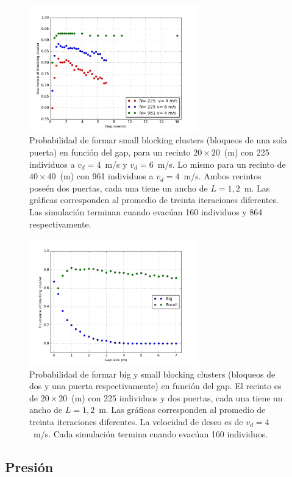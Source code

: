 \begin{figure}[H]
    \centering
    \includegraphics[height=5.5cm]{figuras/proba_vsgap_small_all.png}
    \caption[width=5cm]{Probabilidad de formar small blocking clusters (bloqueos de una sola puerta) en función del gap, para un recinto $20\times 20$~(m) con 225 individuos a $v_d=4$~m/s y $v_d=6$~m/s. Lo mismo para un recinto de $40\times 40$~(m) con 961 individuos a $v_d=4$~m/s. Ambos recintos poseén dos puertas, cada una tiene un ancho de $L=1,2$~m. Las gráficas corresponden al promedio de treinta iteraciones diferentes. Las simulación terminan cuando evacúan 160 individuos y 864 respectivamente.}
    \label{sintesis}
\end{figure}

\begin{figure}[H]
    \centering
    \includegraphics[height=5.5cm]{figuras/proba_vsgap_v4_big_small.png}
    \caption[width=5cm]{Probabilidad de formar big y small blocking clusters (bloqueos de dos y una puerta respectivamente) en función del gap. El recinto es de $20\times 20$~(m) con 225 individuos y dos puertas, cada una tiene un ancho de $L=1,2$~m. Las gráficas corresponden al promedio de treinta iteraciones diferentes. La velocidad de deseo es de $v_d=4$~m/s. Cada simulación termina cuando evacúan 160 individuos.}
    \label{sintesis}
\end{figure}



\subsection{Presión}

